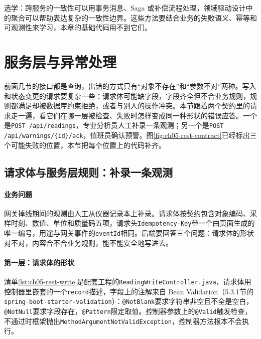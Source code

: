 \begin{tipbox}
选学：跨服务的一致性可以用事务消息、Saga 或补偿流程处理，领域驱动设计中的聚合可以帮助表达复杂的一致性边界。这些方法要结合业务的失败语义、幂等和可观测性来学习，本章的基础代码用不到它们。
\end{tipbox}

\section{服务层与异常处理}


前面几节的接口都是查询，出错的方式只有“对象不存在”和“参数不对”两种。写入和状态变更的请求要复杂一些：请求体可能缺字段，字段齐全但不合业务规则，规则都满足却被数据库约束拒绝，或者与别人的操作冲突。本节跟着两个契约里的请求走一遍，看它们在哪一层被检查、失败时怎样变成同一种形状的错误应答。一个是\texttt{POST /api/readings}，专业分析员人工补录一条观测；另一个是\texttt{POST /api/warnings/\{id\}/ack}，值班员确认预警。图\ref{fig:ch05-rest-contract}已经标出三个可能失败的位置，本节把每个位置上的代码补齐。

\subsection{请求体与服务层规则：补录一条观测}

\paragraph{业务问题}网关掉线期间的观测由人工从仪器记录本上补录。请求体按契约包含对象编码、采样时刻、数值、单位和质量码五项，请求头\texttt{Idempotency-Key}带一个由页面生成的唯一编号，用途与网关事件的\texttt{eventId}相同。后端要回答三个问题：请求体的形状对不对，内容合不合业务规则，能不能安全地写进去。

\paragraph{第一层：请求体的形状}清单\ref{lst:ch05-rest-write}是配套工程的\texttt{ReadingWriteController.java}，请求体用控制器里嵌套的一个\texttt{record}描述，字段上的注解来自 Bean Validation（5.3.1节的\texttt{spring-boot-starter-validation}）：\texttt{@NotBlank}要求字符串非空且不全是空白，\texttt{@NotNull}要求字段存在，\texttt{@Pattern}限定取值。控制器参数上的\texttt{@Valid}触发检查，不通过时框架抛出\texttt{MethodArgumentNotValidException}，控制器方法根本不会执行。

